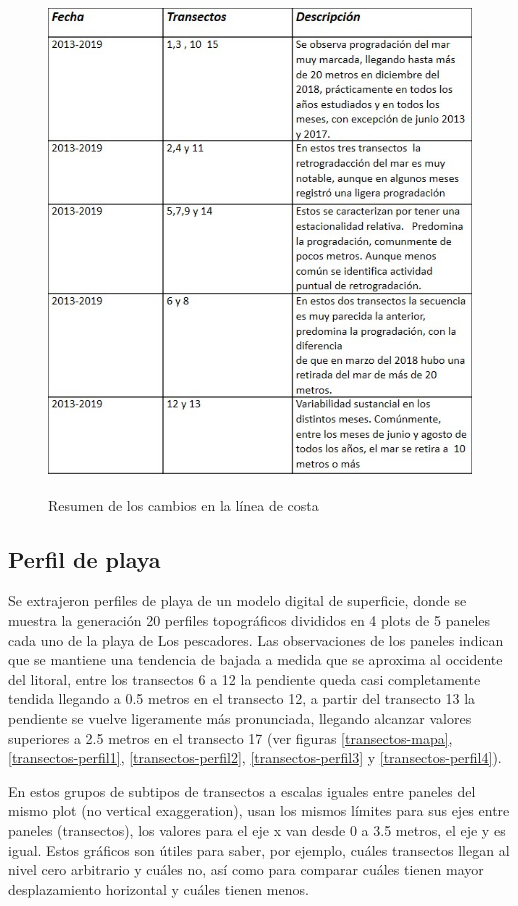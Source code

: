 \documentclass[11pt,]{article}
\begin{document}
\begin{figure}
\centering
\includegraphics[height=5.20833in]{Descripcion_transectos.jpg}
\caption{Resumen de los cambios en la línea de costa
\label{transectosNayajo}}
\end{figure}

\subsection{Perfil de playa}\label{perfil-de-playa}

Se extrajeron perfiles de playa de un modelo digital de superficie,
donde se muestra la generación 20 perfiles topográficos divididos en 4
plots de 5 paneles cada uno de la playa de Los pescadores. Las
observaciones de los paneles indican que se mantiene una tendencia de
bajada a medida que se aproxima al occidente del litoral, entre los
transectos 6 a 12 la pendiente queda casi completamente tendida llegando
a 0.5 metros en el transecto 12, a partir del transecto 13 la pendiente
se vuelve ligeramente más pronunciada, llegando alcanzar valores
superiores a 2.5 metros en el transecto 17 (ver figuras
\ref{transectos-mapa}, \ref{transectos-perfil1},
\ref{transectos-perfil2}, \ref{transectos-perfil3} y
\ref{transectos-perfil4}).

En estos grupos de subtipos de transectos a escalas iguales entre
paneles del mismo plot (no vertical exaggeration), usan los mismos
límites para sus ejes entre paneles (transectos), los valores para el
eje x van desde 0 a 3.5 metros, el eje y es igual. Estos gráficos son
útiles para saber, por ejemplo, cuáles transectos llegan al nivel cero
arbitrario y cuáles no, así como para comparar cuáles tienen mayor
desplazamiento horizontal y cuáles tienen menos.
\end{document}
